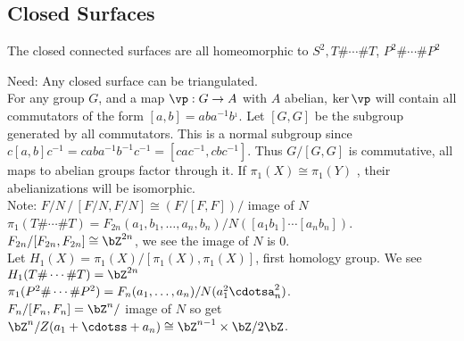 
\subsection{Closed Surfaces}

\begin{theorem}
    The closed connected surfaces are all homeomorphic to $S^2, T \# \cdots \# T$, $P^2 \# \cdots \# P^2$ 
\end{theorem}

\noindent
Need: Any closed surface can be triangulated. \\

\noindent
For any group $G$, and a map $\vp: G \to A$ with $A$ abelian, $\ker \vp$ will contain all commutators of the form $[a,b] = aba^{-1}b^{_1}$. Let $[G,G]$ be the subgroup generated by all commutators. This is a normal subgroup since $c[a,b]c^{-1} = caba^{-1}b^{-1}c^{-1} = [cac^{-1}, cbc^{-1}]$. Thus $G/[G,G]$ is commutative, all maps to abelian groups factor through it. If $\pi_1(X) \cong \pi_1(Y)$ , their abelianizations will be isomorphic. \\

\noindent
Note: $F/N \, /\, [F/N, F/N] \cong (F/[F,F])/$ image of $N$ \\

\noindent
$\pi_1(T \# \cdots \# T) = F_{2n}(a_1, b_1, \ldots, a_n, b_n)/N([a_1b_1] \cdots [a_nb_n])$. $F_{2n}/[F_{2n}, F_{2n}] \cong \bZ^{2n}$, we see the image of $N$ is 0. \\
Let $H_1(X) = \pi_1(X)/[\pi_1(X), \pi_1(X)]$, first homology group. We see $H_1(T \# \cdots \# T) = \bZ^{2n}$ \\
$\pi_1(P^2 \# \cdots \# P^2) = F_n(a_1, \ldots, a_n)/N(a_1^2\cdotsa_n^2)$. \\ 
$F_n/[F_n, F_n]= \bZ^n/$ image of $N$ so get $\bZ^n/Z(a_1 + \cdotss + a_n) \cong \bZ^{n-1} \times \bZ/2\bZ$. 